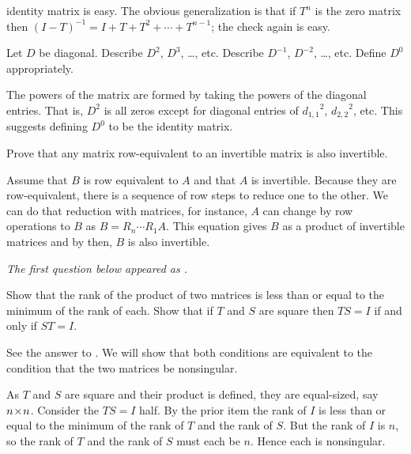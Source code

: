 \begin{exercises}
\begin{answer}
      identity matrix is easy.
      The obvious generalization is that if \( T^n \) is the zero matrix
      then \( (I-T)^{-1}=I+T+T^2+\cdots+T^{n-1} \); the check again is
      easy.  
    \end{answer}
  \recommended \item 
    Let \( D \) be diagonal.
    Describe \( D^2 \), \( D^3 \), \ldots\thinspace, etc.
    Describe \( D^{-1} \), \( D^{-2} \), \ldots\thinspace, etc.
    Define \( D^0 \) appropriately.
    \begin{answer}
      The powers of the matrix are formed by taking the powers of the
      diagonal entries.
      That is,  \( D^2 \) is all zeros except for diagonal entries of
      \( {d_{1,1}}^2 \), \( {d_{2,2}}^2 \), etc.
      This suggests defining \( D^0 \) to be the identity matrix.  
    \end{answer}
  \item
    Prove that any matrix row-equivalent to an invertible matrix is also
    invertible.
    \begin{answer}
      Assume that $B$ is row equivalent to $A$ and that $A$ is invertible.
      Because they are row-equivalent, there is a sequence of row steps 
      to reduce one to the other.
      We can do that reduction with matrices, for instance, $A$ can 
      change by row operations to $B$ as $B=R_n\cdots R_1A$.
      This equation gives $B$ as a product of invertible matrices and
      by  then, $B$ is also invertible.  
    \end{answer}
  \item 
    \textit{The first question below appeared as
    .}
    \begin{exparts}
      \partsitem Show that the rank of the product of two matrices is less than
        or equal to the minimum of the rank of each.
      \partsitem Show that if \( T \)  and \( S \) are square then \( TS=I \)
         if and only if \( ST=I \).
    \end{exparts}
    \begin{answer}
      \begin{exparts}
        \partsitem See the answer to
          .
        \partsitem We will show that both conditions are equivalent to
          the condition that the two matrices be nonsingular. 

          As \( T \) and \( S \) are square and their product is defined,
          they are equal-sized, say \( n \! \times \! n \).
          Consider the \( TS=I \) half.
          By the prior item the rank of \( I \) is less than or equal to
          the minimum of the rank of \( T \) and the rank of \( S \).
          But the rank of \( I \) is \( n \), so the rank of \( T \) and
          the rank of \( S \) must each be \( n \).
          Hence each is nonsingular.


\end{exparts}
\end{answer}
\end{exercises}
